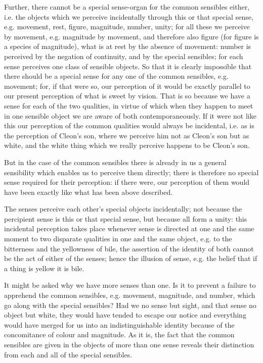 Further, there cannot be a special sense-organ for the common sensibles
either, i.e. the objects which we perceive incidentally through this
or that special sense, e.g. movement, rest, figure, magnitude, number,
unity; for all these we perceive by movement, e.g. magnitude by movement,
and therefore also figure (for figure is a species of magnitude),
what is at rest by the absence of movement: number is perceived by
the negation of continuity, and by the special sensibles; for each
sense perceives one class of sensible objects. So that it is clearly
impossible that there should be a special sense for any one of the
common sensibles, e.g. movement; for, if that were so, our perception
of it would be exactly parallel to our present perception of what
is sweet by vision. That is so because we have a sense for each of
the two qualities, in virtue of which when they happen to meet in
one sensible object we are aware of both contemporaneously. If it
were not like this our perception of the common qualities would always
be incidental, i.e. as is the perception of Cleon's son, where we
perceive him not as Cleon's son but as white, and the white thing
which we really perceive happens to be Cleon's son. 

But in the case of the common sensibles there is already in us a general
sensibility which enables us to perceive them directly; there is therefore
no special sense required for their perception: if there were, our
perception of them would have been exactly like what has been above
described. 

The senses perceive each other's special objects incidentally; not
because the percipient sense is this or that special sense, but because
all form a unity: this incidental perception takes place whenever
sense is directed at one and the same moment to two disparate qualities
in one and the same object, e.g. to the bitterness and the yellowness
of bile, the assertion of the identity of both cannot be the act of
either of the senses; hence the illusion of sense, e.g. the belief
that if a thing is yellow it is bile. 

It might be asked why we have more senses than one. Is it to prevent
a failure to apprehend the common sensibles, e.g. movement, magnitude,
and number, which go along with the special sensibles? Had we no sense
but sight, and that sense no object but white, they would have tended
to escape our notice and everything would have merged for us into
an indistinguishable identity because of the concomitance of colour
and magnitude. As it is, the fact that the common sensibles are given
in the objects of more than one sense reveals their distinction from
each and all of the special sensibles. 

